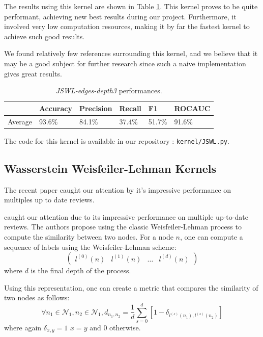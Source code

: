 \documentclass{IEEEtran}
\begin{document}
The results using this kernel are shown in Table \ref{tab:jswl}. This kernel proves to be quite performant, achieving new best results during our project. Furthermore, it involved very low computation resources, making it by far the fastest kernel to achieve such good results.

We found relatively few references surrounding this kernel, and we believe that it may be a good subject for further research since such a naive implementation gives great results.
\begin{table}[h]
    \centering
    \begin{tabular}{l|llll|l}
                & Accuracy & Precision & Recall & F1     & ROCAUC \\
        \hline
        Average & 93.6\%   & 84.1\%    & 37.4\% & 51.7\% & 91.6\% \\
    \end{tabular}
    \caption{\emph{JSWL-edges-depth3} performances.}
    \label{tab:jswl}
\end{table}

The code for this kernel is available in our repository : \texttt{kernel/JSWL.py}.

\subsection{Wasserstein Weisfeiler-Lehman Kernels}

The recent paper \cite{togninalli2019wasserstein}
caught our attention by it's impressive performance
on multiples up to date reviews.

caught our attention due to its impressive performance on multiple up-to-date reviews. The authors propose using the classic Weisfeiler-Lehman process to compute the similarity between two nodes. For a node $n$, one can compute a sequence of labels using the Weisfeiler-Lehman scheme:
$$\begin{pmatrix} l^{(0)}(n) & l^{(1)}(n) & \dots & l^{(d)}(n)\end{pmatrix} $$
where $d$ is the final depth of the process.

Using this representation, one can create a metric that compares the similarity of two nodes as follows:
\begin{equation*}
    \forall n_1 \in \mathcal{N}_1, n_2 \in \mathcal{N}_1,
    d_{n_1, n_2} = \frac{1}{d} \sum_{s = 0}^d [1 - \delta_{l^{(s)}(n_1), l^{(s)}(n_2)}]
\end{equation*}
where again $\delta_{x, y} = 1$  $x=y$ and $0$ otherwise.
\end{document}
